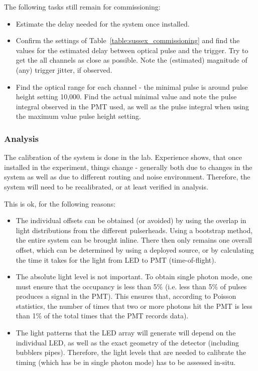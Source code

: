 The following tasks still remain for commissioning:
\begin{itemize}
\item Estimate the delay needed for the system once installed.
\item Confirm the settings of Table~\ref{table:sussex_commissioning} and find the values for the estimated delay between optical pulse and the trigger. Try to get the all channels as close as possible. Note the (estimated) magnitude of (any) trigger jitter, if observed.
\item Find the optical range for each channel - the minimal pulse is around pulse height setting 10,000. Find the actual minimal value and note the pulse integral observed in the PMT used, as well as the pulse integral when using the maximum value pulse height setting.
\end{itemize}

\subsubsection*{Analysis}

The calibration of the system is done in the lab. Experience shows, that once installed in the experiment, things change - generally both due to changes in the system as well as due to different routing and noise environment. Therefore, the system will need to be recalibrated, or at least verified in analysis.

This is ok, for the following reasons:
\begin{itemize}
\item The individual offsets can be obtained (or avoided) by using the overlap in light distributions from the different pulserheads. Using a bootstrap method, the entire system can be brought inline. There then only remains one overall offset, which can be determined by using a deployed source, or by calculating the time it takes for the light from LED to PMT (time-of-flight). 
\item The absolute light level is not important. To obtain single photon mode, one must ensure that the occupancy is less than 5\% (i.e. less than 5\% of pulses produces a signal in the PMT). This ensures that, according to Poisson statistics, the number of times that two or more photons hit the PMT is less than 1\% of the total times that the PMT records data). 
\item The light patterns that the LED array will generate will depend on the individual LED, as well as the exact geometry of the detector (including bubblers pipes). Therefore, the light levels that are needed to calibrate the timing (which has be in single photon mode) has to be assessed in-situ.
\end{itemize}